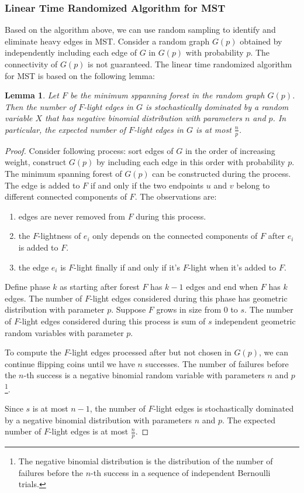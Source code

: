 \documentclass[11pt]{article}
\theoremstyle{plain}
\newtheorem{lemma}{Lemma}[section]
\begin{document}
\subsubsection{Linear Time Randomized Algorithm for MST}

Based on the algorithm above, we can use random sampling to identify and eliminate heavy edges in MST. Consider a random graph $G(p)$ obtained by independently including each edge of $G$ in $G(p)$ with probability $p$. The connectivity of $G(p)$ is not guaranteed. The linear time randomized algorithm for MST is based on the following lemma:

\begin{lemma}
    \label{lemma:randomizedmst}
    Let $F$ be the minimum sppanning forest in the random graph $G(p)$. Then the number of $F$-light edges in $G$ is stochastically dominated by a random variable $X$ that has negative binomial distribution with parameters $n$ and $p$. In particular, the expected number of $F$-light edges in $G$ is at most $\frac{n}{p}$.
\end{lemma}
\begin{proof}
    Consider following process: sort edges of $G$ in the order of increasing weight, construct $G(p)$ by including each edge in this order with probability $p$. The minimum spanning forest of $G(p)$ can be constructed during the process. The edge is added to $F$ if and only if the two endpoints $u$ and $v$ belong to different connected components of $F$. The observations are:
    \begin{enumerate}
        \item edges are never removed from $F$ during this process.
        \item the $F$-lightness of $e_i$ only depends on the connected components of $F$ after $e_i$ is added to $F$.
        \item the edge $e_i$ is $F$-light finally if and only if it's $F$-light when it's added to $F$.
    \end{enumerate}
    Define phase $k$ as starting after forest $F$ has $k-1$ edges and end when $F$ has $k$ edges. The number of $F$-light edges considered during this phase has geometric distribution with parameter $p$. Suppose $F$ grows in size from 0 to $s$. The number of $F$-light edges considered during this process is sum of $s$ independent geometric random variables with parameter $p$.

    To compute the $F$-light edges processed after but not chosen in $G(p)$, we can continue flipping coins until we have $n$ successes. The number of failures before the $n$-th success is a negative binomial random variable with parameters $n$ and $p$\footnote{The negative binomial distribution is the distribution of the number of failures before the $n$-th success in a sequence of independent Bernoulli trials.}. 

    Since $s$ is at most $n-1$, the number of $F$-light edges is stochastically dominated by a negative binomial distribution with parameters $n$ and $p$. The expected number of $F$-light edges is at most $\frac{n}{p}$.
\end{proof}
\end{document}
